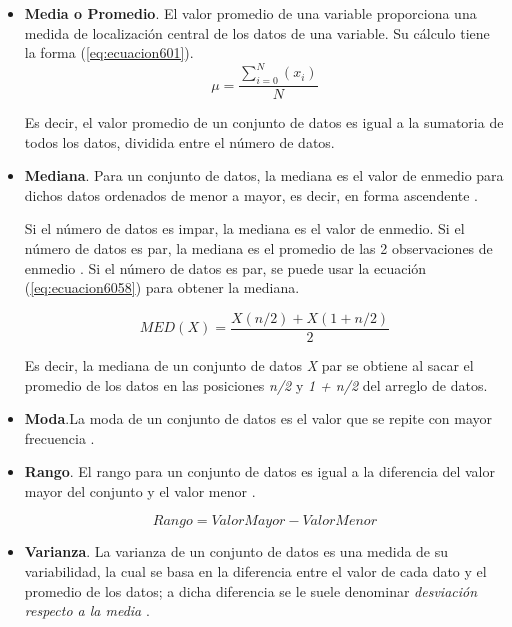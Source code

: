 \begin{itemize}
    \item \textbf{Media o Promedio}. El valor promedio de una variable proporciona una medida de localización central de los datos de una variable. Su cálculo tiene la forma (\ref{eq:ecuacion601}).
    \begin{equation}
	\mu=\frac{\sum_{i=0}^{N} {(x_i)}}{N}
	\label{eq:ecuacion601}
    \end{equation}

	Es decir, el valor promedio de un conjunto de datos es igual a la sumatoria de todos los datos, dividida entre el número de datos.

    \item \textbf{Mediana}. Para un conjunto de datos, la mediana es el valor de enmedio para dichos datos ordenados de menor a mayor, es decir, en forma ascendente \cite{anderson}. 
    
	Si el número de datos es impar, la mediana es el valor de enmedio. Si el número de datos es par, la mediana es el promedio de las 2 observaciones de enmedio \cite{anderson}. Si el número de datos es par, se puede usar 
	la ecuación (\ref{eq:ecuacion6058}) para obtener la mediana.
    
	\begin{equation}
	MED(X)=\frac{X(n/2) + X(1 + n/2)}{2}
	\label{eq:ecuacion6058}
    \end{equation}

	Es decir, la mediana de un conjunto de datos \textit{X} par se obtiene al sacar el promedio de los datos en las posiciones \textit{n/2} y \textit{1 + n/2} del arreglo de datos.

	\item \textbf{Moda}.La moda de un conjunto de datos es el valor que se repite con mayor frecuencia \cite{anderson}.
	\item \textbf{Rango}. El rango para un conjunto de datos es igual a la diferencia del valor mayor del conjunto y el valor menor \cite{anderson}.
	
	\begin{equation}
		Rango=Valor Mayor - Valor Menor
		\label{eq:ecuacion602}
	\end{equation}

	\item \textbf{Varianza}. La varianza de un conjunto de datos es una medida de su variabilidad, la cual se basa en la diferencia entre el valor de cada dato y el promedio de los datos; a dicha diferencia se le suele denominar \textit{desviación respecto a la media} \cite{anderson}.
	

\end{itemize}
